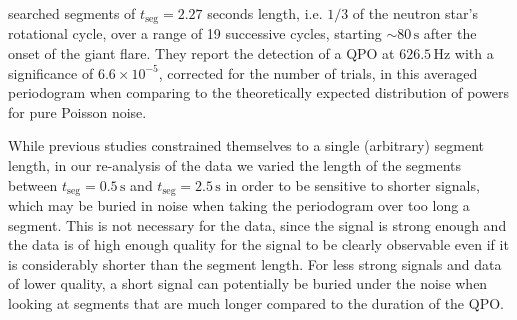 \documentclass{emulateapj}
\begin{document}
\citealt{Watts06} searched segments of $t_{\mathrm{seg}} = 2.27$ seconds length, i.e. $1/3$ of the neutron star's rotational cycle, over a range of 19 successive cycles, starting $\sim 80 \, \mathrm{s}$ after the onset of the giant flare. They report the detection of a QPO at $626.5 \, \mathrm{Hz}$ with a significance of $6.6 \times 10^{-5}$, corrected for the number of trials, in this averaged periodogram when comparing to the theoretically expected distribution of powers for pure Poisson noise.

While previous studies constrained themselves to a single (arbitrary) segment length, in our re-analysis of the \rhessi data we varied the length of the segments between $t_{\mathrm{seg}} = 0.5 \, \mathrm{s}$ and $t_{\mathrm{seg}} = 2.5 \, \mathrm{s}$  in order to be sensitive to shorter signals, which may be buried in noise when taking the periodogram over too long a segment. This is not necessary for the \rxte data, since the signal is strong enough and the data is of high enough quality for the signal to be clearly observable even if it is considerably shorter than the segment length. For less strong signals and data of lower quality, a short signal can potentially be buried under the noise when looking at segments that are much longer compared to the duration of the QPO. 
\end{document}
